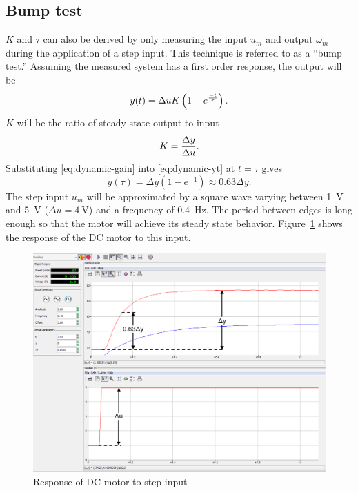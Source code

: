 \subsection{Bump test}\label{sec:bump}
$K$ and $\tau$ can also be derived by only measuring the input $u_m$ and output $\omega_m$ during the application of a step input.
This technique is referred to as a ``bump test.''
Assuming the measured system has a first order response, the output will be
\begin{equation}\label{eq:dynamic-yt}
  y(t) = \Delta u K \left(1 - e^{{-t \over \tau}}\right).
\end{equation}
$K$ will be the ratio of steady state output to input
\begin{equation}\label{eq:dynamic-gain}
  K = {\Delta y \over \Delta u}.
\end{equation}
Substituting \eqref{eq:dynamic-gain} into \eqref{eq:dynamic-yt} at $t = \tau$ gives
\begin{equation}\label{eq:dynamic-tau}
  y(\tau) = \Delta y \left(1 - e^{-1}\right) \approx 0.63 \Delta y.
\end{equation}
The step input $u_m$ will be approximated by a square wave varying between \SI{1}{\volt} and \SI{5}{\volt} ($\Delta u = \SI{4}{\volt}$) and a frequency of \SI{0.4}{\hertz}.
The period between edges is long enough so that the motor will achieve its steady state behavior.
Figure~\ref{fig:step} shows the response of the DC motor to this input.
\pagebreak
\begin{figure}[tbph]
  \centering
  \includegraphics[width=0.95\linewidth]{graphics/part3}
  \caption{Response of DC motor to step input}
  \label{fig:step}
\end{figure}

